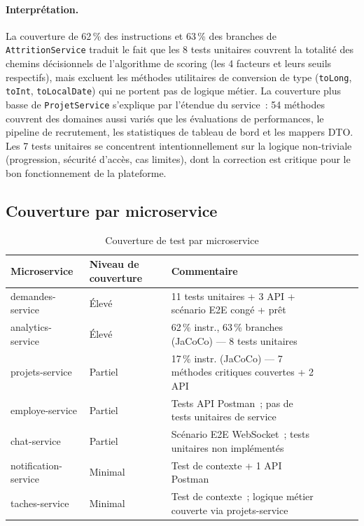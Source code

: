 \paragraph{Interprétation.}
La couverture de 62\,\% des instructions et 63\,\% des branches de
\texttt{AttritionService} traduit le fait que les 8 tests unitaires couvrent
la totalité des chemins décisionnels de l'algorithme de scoring (les 4 facteurs
et leurs seuils respectifs), mais excluent les méthodes utilitaires de
conversion de type (\texttt{toLong}, \texttt{toInt}, \texttt{toLocalDate})
qui ne portent pas de logique métier. La couverture plus basse de
\texttt{ProjetService} s'explique par l'étendue du service~: 54 méthodes
couvrent des domaines aussi variés que les évaluations de performances, le
pipeline de recrutement, les statistiques de tableau de bord et les mappers DTO.
Les 7 tests unitaires se concentrent intentionnellement sur la logique
non-triviale (progression, sécurité d'accès, cas limites), dont la correction
est critique pour le bon fonctionnement de la plateforme.

\subsection{Couverture par microservice}

\begin{table}[H]
\centering
\caption{Couverture de test par microservice}
\label{tab:coverage_per_service}
\begin{tabularx}{\textwidth}{VlVCVLV}
\hline
\textbf{Microservice} & \textbf{Niveau de couverture} & \textbf{Commentaire} \\
\hline
demandes-service & Élevé & 11 tests unitaires + 3 API + scénario E2E congé + prêt \\
\hline
analytics-service & Élevé & 62\,\% instr., 63\,\% branches (JaCoCo) — 8 tests unitaires \\
\hline
projets-service & Partiel & 17\,\% instr. (JaCoCo) — 7 méthodes critiques couvertes + 2 API \\
\hline
employe-service & Partiel & Tests API Postman~; pas de tests unitaires de service \\
\hline
chat-service & Partiel & Scénario E2E WebSocket~; tests unitaires non implémentés \\
\hline
notification-service & Minimal & Test de contexte + 1 API Postman \\
\hline
taches-service & Minimal & Test de contexte~; logique métier couverte via projets-service \\
\hline
\end{tabularx}
\end{table}

